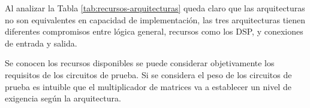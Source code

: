 \begin{table}[H]
  \centering
  \caption{Recursos disponibles en cada arquitectura de eFPGA.}
  \label{tab:recursos-arquitecturas}
\end{table}

Al analizar la Tabla \ref{tab:recursos-arquitecturas} queda claro que las arquitecturas no son equivalentes en capacidad de implementación, las tres arquitecturas tienen diferentes compromisos entre lógica general, recursos como los DSP, y conexiones de entrada y salida.

Se conocen los recursos disponibles se puede considerar objetivamente los requisitos de los circuitos de prueba. Si se considera el peso de los circuitos de prueba es intuible que el multiplicador de matrices va a establecer un nivel de exigencia según la arquitectura.

\begin{table}[H]
  \centering
  \caption{Utilización de celdas lógicas y de entrada y salida tras la implementación de cada circuito en cada arquitectura.}
  \label{tab:utilizacion}
\end{table}

